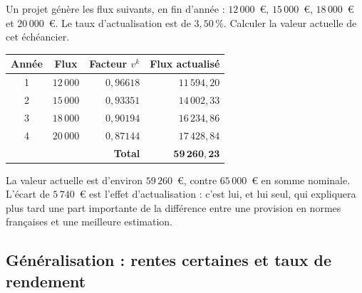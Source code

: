 \begin{exercice}
Un projet génère les flux suivants, en fin d'année : $12\,000$~\euro,
$15\,000$~\euro, $18\,000$~\euro{} et $20\,000$~\euro. Le taux d'actualisation
est de $3{,}50\,\%$. Calculer la valeur actuelle de cet échéancier.
\end{exercice}

\begin{corrige}
\begin{center}\small
\begin{tabular}{ccrr}
\toprule
Année & Flux & Facteur $v^{k}$ & Flux actualisé \\
\midrule
1 & $12\,000$ & $0{,}96618$ & $11\,594{,}20$ \\
2 & $15\,000$ & $0{,}93351$ & $14\,002{,}33$ \\
3 & $18\,000$ & $0{,}90194$ & $16\,234{,}86$ \\
4 & $20\,000$ & $0{,}87144$ & $17\,428{,}84$ \\
\midrule
\multicolumn{3}{r}{\textbf{Total}} & $\mathbf{59\,260{,}23}$ \\
\bottomrule
\end{tabular}
\end{center}
La valeur actuelle est d'environ $59\,260$~\euro, contre $65\,000$~\euro{} en
somme nominale. L'écart de $5\,740$~\euro{} est l'effet d'actualisation : c'est
lui, et lui seul, qui expliquera plus tard une part importante de la différence
entre une provision en normes françaises et une meilleure estimation.
\end{corrige}

\subsection{Généralisation : rentes certaines et taux de rendement}

